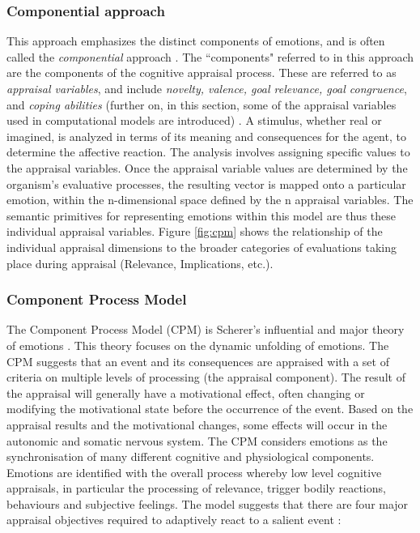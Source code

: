 \documentclass[11pt]{article}
\begin{document}
\subsubsection{Componential approach}
\label{sec:componential-theories}

This approach emphasizes the distinct components of emotions, and is often
called the \textit{componential} approach \cite{leventhal:emotion-cognition}.
The ``components" referred to in this approach are the components of the
cognitive appraisal process. These are referred to as \textit{appraisal
variables}, and include \textit{novelty, valence, goal relevance, goal
congruence}, and \textit{coping abilities}
(further on, in this section, some of the appraisal variables used in
computational models are introduced)
\cite{scherer:nature-function-emotion,scherer:appraisal-processes}. A stimulus,
whether real or imagined, is analyzed in terms of its meaning and consequences
for the agent, to determine the affective reaction. The analysis involves
assigning specific values to the appraisal variables. Once the appraisal
variable values are determined by the organism’s evaluative processes, the
resulting vector is mapped onto a particular emotion, within the n-dimensional
space defined by the n appraisal variables. The semantic primitives for
representing emotions within this model are thus these individual appraisal
variables. Figure \ref{fig:cpm} shows the relationship of the individual
appraisal dimensions to the broader categories of evaluations taking place
during appraisal (Relevance, Implications, etc.).

\subsubsection{Component Process Model}
\label{sec:cpm}

The Component Process Model (CPM) is Scherer's influential and major theory of
emotions
\cite{scherer:sequential-appraisal-process,scherer:appraisal-processes}. This
theory focuses on the dynamic unfolding of emotions. The CPM suggests that an
event and its consequences are appraised with a set of criteria on multiple
levels of processing (the appraisal component). The result of the appraisal will
generally have a motivational effect, often changing or modifying the
motivational state before the occurrence of the event. Based on the appraisal
results and the motivational changes, some effects will occur in the autonomic
and somatic nervous system. The CPM considers emotions as the synchronisation of
many different cognitive and physiological components. Emotions are identified
with the overall process whereby low level cognitive appraisals, in particular
the processing of relevance, trigger bodily reactions, behaviours and subjective
feelings. The model suggests that there are four major appraisal objectives
required to adaptively react to a salient event
\cite{scherer:dynamic-architecture-emotion}:
\end{document}
